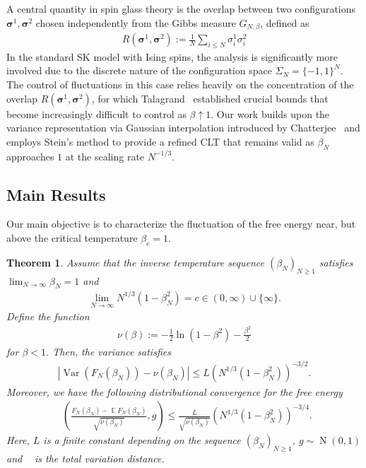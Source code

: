 \documentclass[letterpaper,11pt,reqno]{amsart}
\newtheorem{thm}{Theorem}[section]
\renewcommand{\le}{\leqslant}
\renewcommand{\ge}{\geqslant}
\renewcommand{\leq}{\leqslant}
\renewcommand{\geq}{\geqslant}
\newcommand{\abs}[1]{\left\vert#1\right\vert}
\newcommand{\mvgs}{\boldsymbol{\sigma}}\newcommand{\mvgS}{\boldsymbol{\Sigma}}\newcommand{\mvgt}{\boldsymbol{\tau}}
\DeclareMathOperator{\E}{\mathds{E}}
\DeclareMathOperator{\N}{N}
\DeclareMathOperator{\var}{Var}
\DeclareMathOperator{\dtv}{d_{TV}}
\begin{document}
A central quantity in spin glass theory is the overlap between two configurations $\mvgs^1, \mvgs^2$ chosen independently from the Gibbs measure $G_{N,\beta}$, defined as
\begin{align*}
R(\mvgs^1, \mvgs^2) := \frac{1}{N} \sum_{i \leq N} \sigma_i^1 \sigma_i^2
\end{align*}
In the standard SK model with Ising spins, the analysis is significantly more involved due to the discrete nature of the configuration space $\Sigma_N = \{-1, 1\}^N$. The control of fluctuations in this case relies heavily on the concentration of the overlap $R(\mvgs^1, \mvgs^2)$, for which Talagrand~\cite{Tal2} established crucial bounds that become increasingly difficult to control as $\beta \uparrow 1$. Our work builds upon the variance representation via Gaussian interpolation introduced by Chatterjee~\cite{Cha09} and employs Stein's method to provide a refined CLT that remains valid as $\beta_N$ approaches $1$ at the scaling rate $N^{-1/3}$.



\subsection{Main Results}
Our main objective is to characterize the fluctuation of the free energy near, but above the critical temperature $\beta_c = 1$. 

\begin{thm}\label{thm:main}
    Assume that the inverse temperature sequence $(\beta_N)_{N \ge 1}$ satisfies $\lim_{N\to\infty}\beta_N=1$ and 
    \begin{align}\label{eq:beta-condition}
        \lim_{N \to \infty} N^{1/3} (1 - \beta_N^2) = c \in (0,\infty)\cup\{\infty\}.
    \end{align} 
    Define the function
    \begin{align*}
    \nu(\beta) := -\frac{1}{2} \ln (1-\beta^2) - \frac{\beta^2}{2}
    \end{align*}
    for $\beta<1$.
    Then, the variance satisfies
    \begin{align} \label{eq:thm var}
        \abs{\var(F_N(\beta_N)) - \nu(\beta_N)} \leq L \left( N^{1/3}(1-\beta_N^2) \right)^{-3/2}. 
    \end{align}
   Moreover, we have the following distributional convergence for the free energy
    \begin{align} \label{eq:thm dist}
        \dtv\left(\frac{F_N(\beta_N) - \E F_N(\beta_N)}{\sqrt{\nu (\beta_N)}} ,g\right)\le \frac{L}{\sqrt{\nu (\beta_N)}} \left( N^{1/3}(1-\beta_N^2) \right)^{-3/4}.
    \end{align}
Here, \(L\) is a finite constant depending on the sequence \((\beta_N)_{N \geq 1}\), $g\sim\N(0,1)$ and $\dtv$ is the total variation distance. 
\end{thm}
\end{document}
